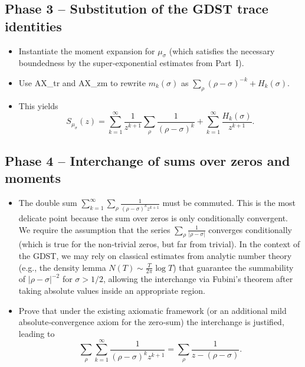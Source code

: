 \documentclass[12pt,a4paper]{article}
\begin{document}
\subsection{Phase 3 – Substitution of the GDST trace identities}
\begin{itemize}
    \item Instantiate the moment expansion for $\mu_\sigma$ (which satisfies the 
          necessary boundedness by the super‑exponential estimates from Part~I).
    \item Use AX\_tr and AX\_zm to rewrite $m_k(\sigma)$ as $\sum_\rho (\rho-\sigma)^{-k} 
          + H_k(\sigma)$.
    \item This yields
          \[
          S_{\mu_\sigma}(z) = \sum_{k=1}^\infty \frac{1}{z^{k+1}} \sum_{\rho} 
          \frac{1}{(\rho-\sigma)^k} + \sum_{k=1}^\infty \frac{H_k(\sigma)}{z^{k+1}}.
          \]
\end{itemize}

\subsection{Phase 4 – Interchange of sums over zeros and moments}
\begin{itemize}
    \item The double sum $\sum_{k=1}^\infty \sum_{\rho} \frac{1}{(\rho-\sigma)^k z^{k+1}}$ 
          must be commuted.  This is the most delicate point because the sum over 
          zeros is only conditionally convergent.  We require the assumption that the 
          series $\sum_\rho \frac{1}{|\rho-\sigma|}$ converges conditionally (which is 
          true for the non‑trivial zeros, but far from trivial).  In the context of 
          the GDST, we may rely on classical estimates from analytic number theory 
          (e.g., the density lemma $N(T) \sim \frac{T}{2\pi}\log T$) that guarantee 
          the summability of $|\rho-\sigma|^{-2}$ for $\sigma>1/2$, allowing the 
          interchange via Fubini's theorem after taking absolute values inside an 
          appropriate region.
    \item Prove that under the existing axiomatic framework (or an additional mild 
          absolute‑convergence axiom for the zero‑sum) the interchange is justified, 
          leading to
          \[
          \sum_{\rho} \sum_{k=1}^\infty \frac{1}{(\rho-\sigma)^k z^{k+1}} 
          = \sum_{\rho} \frac{1}{z - (\rho-\sigma)}.
          \]
\end{itemize}
\end{document}
